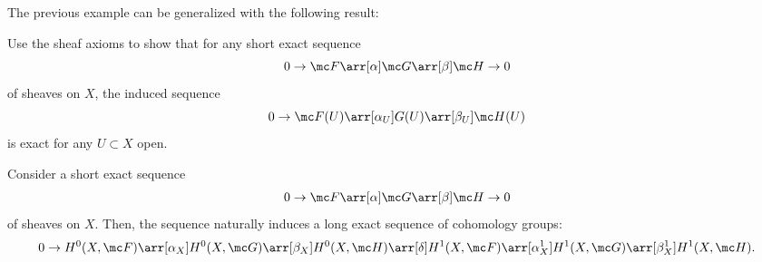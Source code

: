\documentclass[11pt]{report}
\begin{document}
The previous example can be generalized with the following result:
    \begin{exercise}[][label=exer:shortexacttoshortexact]
        Use the sheaf axioms to show that for any short exact sequence
        \[
        0 \to \mc F \arr[\alpha]\mc G \arr[\beta]\mc H \to 0
        \]
        of sheaves on $X$, the induced sequence
        \[
        0 \to \mc F(U) \arr[\alpha _U]G(U) \arr[\beta_U]\mc H(U)
        \]
        is exact for any $U \subset X$ open.
    \end{exercise}

\begin{thm}[][label=thm:longexact]
Consider a short exact sequence
\begin{align} \label{eq:shortexactseq}
    0 \to \mc F \arr[\alpha]\mc G \arr[\beta]\mc H \to 0
\end{align}
of sheaves on $X$. Then, the sequence naturally induces a long exact sequence of cohomology groups:
\[
0 \to H^0(X,\mc F) \arr[\alpha_X] H^0(X,\mc G)\arr[\beta_X]H^0(X,\mc H) \arr[\delta] H^1(X,\mc F) \arr[\alpha_X^1] H^1(X,\mc G)\arr[\beta_X^1]H^1(X,\mc H).
\]
\end{thm}
\end{document}
